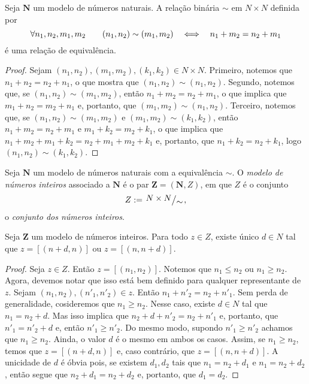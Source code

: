 \begin{prop}
	Seja $\bm N$ um modelo de números naturais. A relação binária $\sim$ em $N \times N$ definida por
	\begin{equation*}
	\forall n_1,n_2,m_1,m_2 \qquad (n_1,n_2) \sim (m_1,m_2) \quad \Longleftrightarrow \quad n_1+m_2=n_2+m_1
	\end{equation*}
é uma relação de equivalência.
\end{prop}
\begin{proof}
	Sejam $(n_1,n_2), (m_1,m_2),(k_1,k_2) \in N \times N$. Primeiro, notemos que $n_1+n_2=n_2+n_1$, o que mostra que $(n_1,n_2) \sim (n_1,n_2)$. Segundo, notemos que, se $(n_1,n_2) \sim (m_1,m_2)$, então $n_1+m_2=n_2+m_1$, o que implica que $m_1+n_2=m_2+n_1$ e, portanto, que $(m_1,m_2) \sim (n_1,n_2)$. Terceiro, notemos que, se $(n_1,n_2) \sim (m_1,m_2)$ e $(m_1,m_2) \sim (k_1,k_2)$, então $n_1+m_2=n_2+m_1$ e $m_1+k_2=m_2+k_1$, o que implica que $n_1+m_2+m_1+k_2=n_2+m_1+m_2+k_1$ e, portanto, que $n_1+k_2=n_2+k_1$, logo $(n_1,n_2) \sim (k_1,k_2)$.
\end{proof}

\begin{defi}
	Seja $\bm N$ um modelo de números naturais com a equivalência $\sim$. O \emph{modelo de números inteiros} associado a $\bm N$ é o par $\bm Z = (\bm N,Z)$, em que $Z$ é o conjunto 
	\begin{equation*}
	Z := \quo{N \times N}{\sim},
	\end{equation*}
o \emph{conjunto dos números inteiros}.
\end{defi}

\begin{prop}
	Seja $\bm Z$ um modelo de números inteiros. Para todo $z \in Z$, existe único $d \in N$ tal que $z=[(n+d,n)]$ ou $z=[(n,n+d)]$.
\end{prop}
\begin{proof}
	Seja $z \in Z$. Então $z=[(n_1,n_2)]$. Notemos que $n_1 \leq n_2$ ou $n_1 \geq n_2$. Agora, devemos notar que isso está bem definido para qualquer representante de $z$. Sejam $(n_1,n_2),(n'_1,n'_2) \in z$. Então $n_1+n'_2=n_2+n'_1$. Sem perda de generalidade, cosideremos que $n_1 \geq n_2$. Nesse caso, existe $d \in N$ tal que $n_1=n_2+d$. Mas isso implica que $n_2+d+n'_2=n_2+n'_1$ e, portanto, que $n'_1=n'_2+d$ e, então $n'_1 \geq n'_2$. Do mesmo modo, supondo $n'_1 \geq n'_2$ achamos que $n_1 \geq n_2$. Ainda, o valor $d$ é o mesmo em ambos os casos. Assim, se $n_1 \geq n_2$, temos que $z=[(n+d,n)]$ e, caso contrário, que $z=[(n,n+d)]$. A unicidade de $d$ é óbvia pois, se existem $d_1,d_2$ tais que $n_1=n_2+d_1$ e $n_1=n_2+d_2$, então segue que $n_2+d_1=n_2+d_2$ e, portanto, que $d_1=d_2$.
\end{proof}


